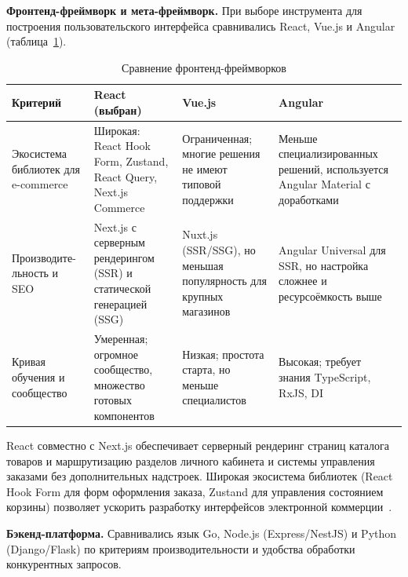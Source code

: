 \textbf{Фронтенд-фреймворк и мета-фреймворк.} При выборе инструмента для построения пользовательского интерфейса сравнивались React, Vue.js и Angular (таблица~\ref{tab:frontend_compare}).

\begin{table}[H]
    \centering
    \caption{Сравнение фронтенд-фреймворков}
    \label{tab:frontend_compare}
    \small
    \begin{tabular}{|p{2.5cm}|p{4cm}|p{4cm}|p{4cm}|}
        \hline
        \textbf{Критерий} & \textbf{React (выбран)} & \textbf{Vue.js} & \textbf{Angular} \\ \hline
        Экосистема библиотек для e-commerce & Широкая: React Hook Form, Zustand, React Query, Next.js Commerce & Ограниченная; многие решения не имеют типовой поддержки & Меньше специализированных решений, используется Angular Material с доработками \\ \hline
        Производите- \newline льность и SEO & Next.js с серверным рендерингом (SSR) и статической генерацией (SSG) & Nuxt.js (SSR/SSG), но меньшая популярность для крупных магазинов & Angular Universal для SSR, но настройка сложнее и ресурсоёмкость выше \\ \hline
        Кривая обучения и сообщество & Умеренная; огромное сообщество, множество готовых компонентов & Низкая; простота старта, но меньше специалистов & Высокая; требует знания TypeScript, RxJS, DI \\ \hline
    \end{tabular}
\end{table}

React совместно с Next.js обеспечивает серверный рендеринг страниц каталога товаров и маршрутизацию разделов личного кабинета и системы управления заказами без дополнительных надстроек. Широкая экосистема библиотек (React Hook Form для форм оформления заказа, Zustand для управления состоянием корзины) позволяет ускорить разработку интерфейсов электронной коммерции~\cite{react_docs}.

\textbf{Бэкенд-платформа.} Сравнивались язык Go, Node.js (Express/NestJS) и Python (Django/Flask) по критериям производительности и удобства обработки конкурентных запросов.

